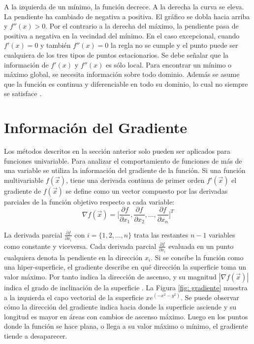 A la izquierda de un mínimo, la función decrece. A la derecha la curva se eleva. La pendiente ha cambiado de negativa a positiva. El gráfico se dobla hacia arriba y $f''(x)> 0$. Por el contrario a la derecha del máximo, la pendiente pasa de positiva a negativa en la vecindad del mínimo. En el caso excepcional,
cuando $f'(x) = 0$ y también $f''(x) = 0$ la regla no se cumple y el punto puede ser cualquiera de los tres tipos de puntos estacionarios. Se debe señalar que la información de $f'(x)$ y $f''(x)$ es sólo  local. Para encontrar un mínimo o máximo global, se necesita información sobre todo dominio. Además se asume que la función es continua y diferenciable en todo su dominio, lo cual no siempre se satisface \cite{gilbert_calculus_2010}.
\section{Información del Gradiente}
Los métodos descritos en la sección anterior solo pueden ser aplicados para funciones univariable. Para analizar el comportamiento de funciones de más de una variable se utiliza la información del gradiente de la función. Si una función multivariable $f(\vec{x})$, tiene una derivada continua de primer orden $f'(\vec{x})$ el gradiente de $f(\vec{x})$ se define como un vector compuesto por las derivadas parciales de la función objetivo respecto a cada variable:
\begin{equation}
\nabla f(\vec{x})=\bigg[ \frac{\partial f}{\partial x_1}, \frac{\partial f}{\partial x_2},\ldots,\frac{\partial f}{\partial x_n}\bigg]^T
\end{equation}

La derivada parcial  $\frac{\partial f}{\partial x_i}$ con $i=\{1,2,\ldots,n\}$ trata las restantes $n-1$ variables como constante y viceversa. Cada derivada parcial $\frac{\partial f}{\partial x_i}$ evaluada en un punto cualquiera denota la pendiente en la dirección $x_i$. Si se concibe la función como una hiper-superficie, el gradiente describe en qué dirección la superficie toma un valor máximo. Por tanto indica la dirección de ascenso, y su magnitud $|\nabla f(\vec{x})|$ indica el grado de inclinación de la superficie \cite{gilbert_calculus_2010}. La Figura \ref{fig: gradiente} muestra a la izquierda el capo vectorial de la superficie $x e^{(-x^2-y^2)}$. Se puede observar cómo la dirección del gradiente indica hacia donde la superficie asciende y su longitud es mayor en áreas con cambios de ascenso máximo. Luego en los puntos donde la función se hace plana, o llega a su valor máximo o mínimo, el gradiente tiende a desaparecer.  


